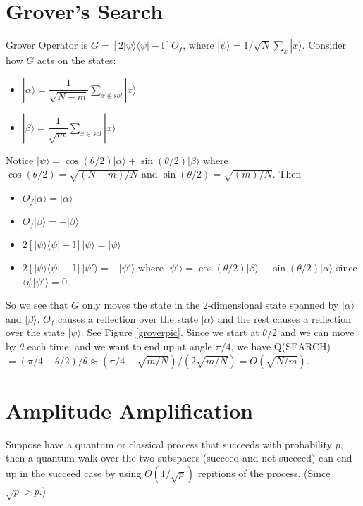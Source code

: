 \documentclass[12pt]{article}
\begin{document}
\section{Grover's Search}

Grover Operator is $G=[2|\psi\rangle\langle\psi|-\mathbb{I}]O_f$, where $|\psi\rangle=1/\sqrt{N}\sum_x|x\rangle$.
Consider how $G$ acts on the states:
\begin{itemize}
\item$ |\alpha\rangle=\dfrac{1}{\sqrt{N-m}}\sum_{x\not\in sol}|x\rangle$
\item$ |\beta\rangle=\dfrac{1}{\sqrt{m}}\sum_{x\in sol}|x\rangle$
\end{itemize}
Notice $|\psi\rangle=\cos(\theta/2)|\alpha\rangle+\sin(\theta/2)|\beta\rangle$ where $\cos(\theta/2)=\sqrt{(N-m)/N}$ and $\sin(\theta/2)=\sqrt{(m)/N}$.
Then
\begin{itemize}
\item $O_f|\alpha\rangle=|\alpha\rangle$
\item $O_f|\beta\rangle=-|\beta\rangle$
\item$2[|\psi\rangle\langle\psi|-\mathbb{I}]|\psi\rangle=|\psi\rangle$
\item$2[|\psi\rangle\langle\psi|-\mathbb{I}]|\psi ' \rangle=-|\psi'\rangle$ where $|\psi'\rangle=\cos(\theta/2)|\beta\rangle-\sin(\theta/2)|\alpha\rangle$ since $\langle \psi|\psi'\rangle=0$.
\end{itemize}
So we see that $G$ only moves the state in the 2-dimensional state spanned by $|\alpha\rangle$ and $|\beta\rangle$. $O_f$ causes a reflection over the state $|\alpha\rangle$ and the rest causes a reflection over the state $|\psi \rangle$. See Figure \ref{groverpic}. Since we start at $\theta/2$ and we can move by $\theta$ each time, and we want to end up at angle $\pi/4$, we have Q(SEARCH)$=(\pi/4-\theta/2)/\theta\approx (\pi/4-\sqrt{m/N})/(2\sqrt{m/N})=O(\sqrt{N/m})$.

\section{Amplitude Amplification}
Suppose have a quantum or classical process that succeeds with probability $p$, then a quantum walk over the two subspaces (succeed and not succeed) can end up 
in the succeed case by using $O(1/\sqrt{p})$ repitions of the process. (Since $\sqrt{p}>p$.)
\end{document}
